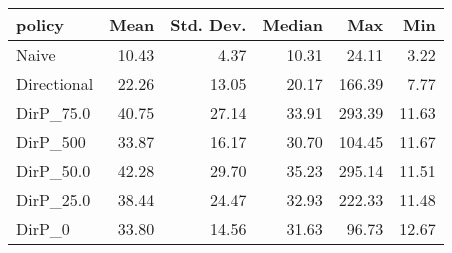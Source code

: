 \begin{tabular}{lrrrrr}
\toprule
     policy &  Mean &  Std. Dev. &  Median &    Max &   Min \\
\midrule
      Naive & 10.43 &       4.37 &   10.31 &  24.11 &  3.22 \\
Directional & 22.26 &      13.05 &   20.17 & 166.39 &  7.77 \\
  DirP\_75.0 & 40.75 &      27.14 &   33.91 & 293.39 & 11.63 \\
   DirP\_500 & 33.87 &      16.17 &   30.70 & 104.45 & 11.67 \\
  DirP\_50.0 & 42.28 &      29.70 &   35.23 & 295.14 & 11.51 \\
  DirP\_25.0 & 38.44 &      24.47 &   32.93 & 222.33 & 11.48 \\
     DirP\_0 & 33.80 &      14.56 &   31.63 &  96.73 & 12.67 \\
\bottomrule
\end{tabular}
